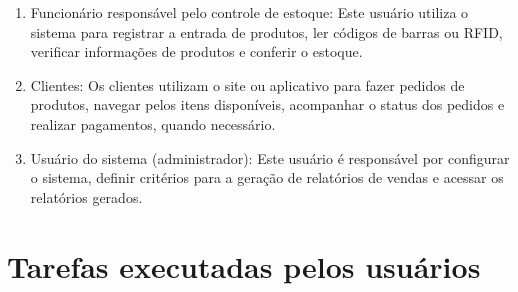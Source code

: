 \documentclass[
	12pt,				%
	openright,			%
	twoside,			%
	a4paper,			%
	english,			%
	brazil				%
	]{abntex2}
\begin{document}
\begin{enumerate}
	\item Funcionário responsável pelo controle de estoque: Este usuário utiliza o sistema para registrar a entrada de produtos, ler códigos de barras ou RFID, verificar informações de produtos e conferir o estoque.
	\item Clientes: Os clientes utilizam o site ou aplicativo para fazer pedidos de produtos, navegar pelos itens disponíveis, acompanhar o status dos pedidos e realizar pagamentos, quando necessário.
	\item Usuário do sistema (administrador): Este usuário é responsável por configurar o sistema, definir critérios para a geração de relatórios de vendas e acessar os relatórios gerados.
\end{enumerate}

\section{Tarefas executadas pelos usuários}\label{Tarefas_usuarios_contex_uso}
\end{document}
